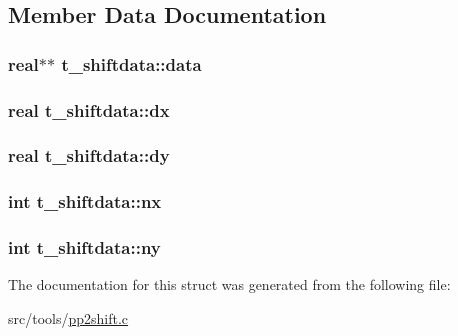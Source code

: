 \subsection{\-Member \-Data \-Documentation}
\hypertarget{structt__shiftdata_a6edf915eb8eead5fcaa9b1c42195dc3a}{
\subsubsection[{data}]{\setlength{\rightskip}{0pt plus 5cm}real$\ast$$\ast$ {\bf t\-\_\-shiftdata\-::data}}}\label{structt__shiftdata_a6edf915eb8eead5fcaa9b1c42195dc3a}
\hypertarget{structt__shiftdata_a90900e3a7042e0695426e7515e46bfbf}{
\subsubsection[{dx}]{\setlength{\rightskip}{0pt plus 5cm}real {\bf t\-\_\-shiftdata\-::dx}}}\label{structt__shiftdata_a90900e3a7042e0695426e7515e46bfbf}
\hypertarget{structt__shiftdata_a13db98617001091323bf494fff9fb206}{
\subsubsection[{dy}]{\setlength{\rightskip}{0pt plus 5cm}real {\bf t\-\_\-shiftdata\-::dy}}}\label{structt__shiftdata_a13db98617001091323bf494fff9fb206}
\hypertarget{structt__shiftdata_a61abb437d4ce4b5d6e00743024866c85}{
\subsubsection[{nx}]{\setlength{\rightskip}{0pt plus 5cm}int {\bf t\-\_\-shiftdata\-::nx}}}\label{structt__shiftdata_a61abb437d4ce4b5d6e00743024866c85}
\hypertarget{structt__shiftdata_aabc087fb53be1c60581e3bbf0bf1d74c}{
\subsubsection[{ny}]{\setlength{\rightskip}{0pt plus 5cm}int {\bf t\-\_\-shiftdata\-::ny}}}\label{structt__shiftdata_aabc087fb53be1c60581e3bbf0bf1d74c}


\-The documentation for this struct was generated from the following file\-:\begin{DoxyCompactItemize}
\item 
src/tools/\hyperlink{pp2shift_8c}{pp2shift.\-c}\end{DoxyCompactItemize}
